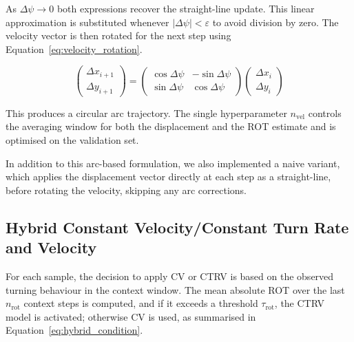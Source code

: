     As $\Delta\psi \to 0$ both expressions recover the straight-line update. %
    This linear approximation is substituted whenever $|\Delta\psi| < \varepsilon$
    to avoid division by zero. The velocity vector is then rotated for the next
    step using Equation~\ref{eq:velocity_rotation}. %
    
    \begin{equation}
        \begin{pmatrix} \Delta x_{i+1} \\ \Delta y_{i+1} \end{pmatrix}
        =
        \begin{pmatrix} \cos\Delta\psi & -\sin\Delta\psi \\
                        \sin\Delta\psi &  \cos\Delta\psi \end{pmatrix}
        \begin{pmatrix} \Delta x_i \\ \Delta y_i \end{pmatrix}
        \label{eq:velocity_rotation}
    \end{equation}
    
    This produces a circular arc trajectory. %
    The single
    hyperparameter $n_\text{vel}$ controls the averaging window for both the
    displacement and the \ac{ROT} estimate and is optimised on the validation
    set.%
    
    In addition to this arc-based formulation, we also implemented a naive variant, which applies the displacement vector directly at each step as a straight-line, before rotating the velocity, skipping any arc corrections.



    
    \subsection{Hybrid Constant Velocity/Constant Turn Rate and Velocity}
    \label{sec:method-hybrid}
    For each sample, the decision to apply \ac{CV} or \ac{CTRV} is based on the observed turning behaviour in the context window. The mean
    absolute \ac{ROT} over the last $n_\text{rot}$ context steps is computed,
    and if it exceeds a threshold $\tau_\text{rot}$, the \ac{CTRV} model is
    activated; otherwise \ac{CV} is used, as summarised in Equation~\ref{eq:hybrid_condition}.
    
